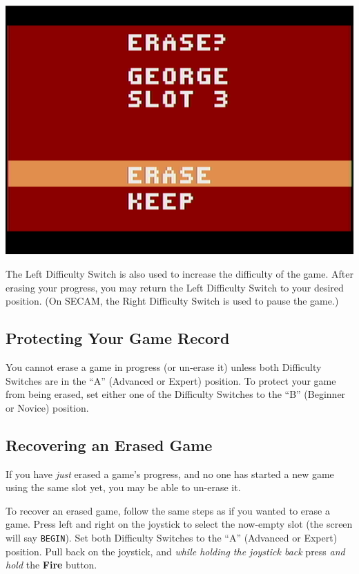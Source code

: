 \documentclass[10pt,twocolumn,openany,article]{memoir}
\begin{document}
\begin{center}
  \includegraphics[width=\columnwidth]{../Manual/ConfirmEraseNTSC.png}
\end{center}

\fi

The Left  Difficulty Switch is also  used to increase the  difficulty of
the  game.  After  erasing  your  progress,  you  may  return  the  Left
Difficulty  Switch  to  your  desired position.  (On  SECAM,  the  Right
Difficulty Switch is used to pause the game.)

\subsection{Protecting Your Game Record}

You  cannot erase  a  game  in progress  (or  un-erase  it) unless  both
Difficulty  Switches are  in the  ``A'' (Advanced  or Expert)  position.
To protect your game from being erased, set either one of the Difficulty
Switches to the ``B'' (Beginner or Novice) position.

\ifdefined\DEMO\else

\subsection{Recovering an Erased Game}

If you have \emph{just} erased a game's progress, and no one has started
a new game using the same slot yet, you may be able to un-erase it.

To recover  an erased game,  follow the same steps  as if you  wanted to
erase  a game.  Press  left and  right  on the  joystick  to select  the
now-empty slot (the screen will say \texttt{BEGIN}). Set both Difficulty
Switches to  the ``A'' (Advanced or  Expert) position. Pull back  on the
joystick,  and \emph{while  holding the  joystick back}  press \emph{and
  hold} the \textbf{Fire} button.
\end{document}
